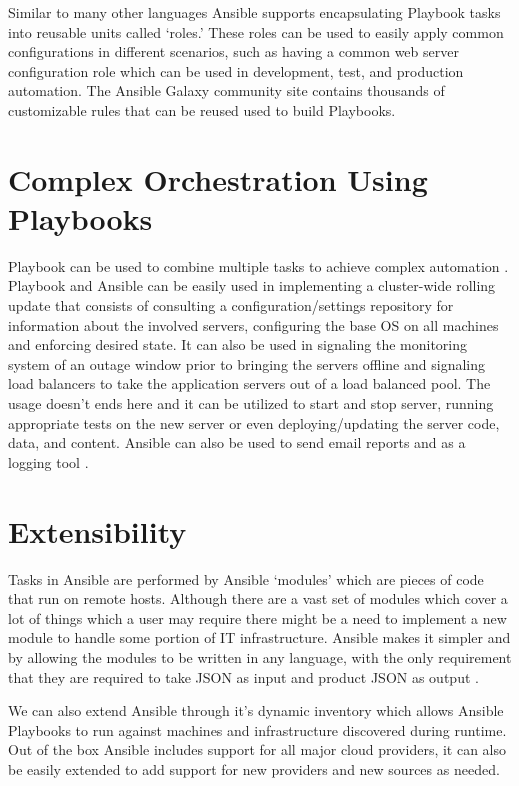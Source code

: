 \documentclass[9pt,twocolumn,twoside]{../../styles/osajnl}
\begin{document}
Similar to many other languages Ansible supports encapsulating
Playbook tasks into reusable units called ‘roles.’ These roles can be
used to easily apply common configurations in different scenarios,
such as having a common web server configuration role which can be
used in development, test, and production automation. The Ansible
Galaxy community site contains thousands of customizable rules that
can be reused used to build Playbooks.

\section{Complex Orchestration Using Playbooks}

Playbook can be used to combine multiple tasks to achieve complex
automation \cite{www-ansible5}. Playbook and Ansible can be easily used
in implementing a cluster-wide rolling update that consists of
consulting a configuration/settings repository for information about
the involved servers, configuring the base OS on all machines and
enforcing desired state. It can also be used in signaling the
monitoring system of an outage window prior to bringing the servers
offline and signaling load balancers to take the application servers
out of a load balanced pool. The usage doesn't ends here and it can be
utilized to start and stop server, running appropriate tests on the
new server or even deploying/updating the server code, data, and
content. Ansible can also be used to send email reports and as a
logging tool \cite{www-ansible}.

\section{Extensibility}

Tasks in Ansible are performed by Ansible ‘modules’ which are pieces
of code that run on remote hosts. Although there are a vast set of
modules which cover a lot of things which a user may require there
might be a need to implement a new module to handle some portion of IT
infrastructure. Ansible makes it simpler and by allowing the modules
to be written in any language, with the only requirement that they are
required to take JSON as input and product JSON as
output \cite{www-ansible}.

We can also extend Ansible through it's dynamic inventory which allows
Ansible Playbooks to run against machines and infrastructure
discovered during runtime. Out of the box Ansible includes support for
all major cloud providers, it can also be easily extended to add
support for new providers and new sources as needed.
\end{document}
